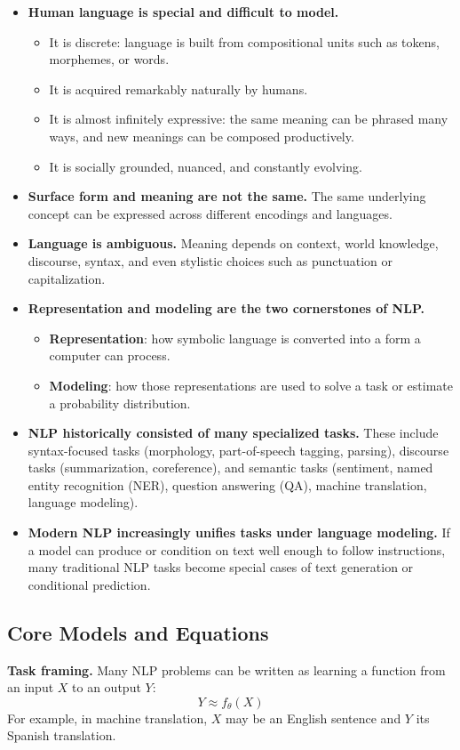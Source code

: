 \documentclass[11pt]{article}
\begin{document}
\begin{itemize}
    \item \textbf{Human language is special and difficult to model.}
    \begin{itemize}
        \item It is discrete: language is built from compositional units such as tokens, morphemes, or words.
        \item It is acquired remarkably naturally by humans.
        \item It is almost infinitely expressive: the same meaning can be phrased many ways, and new meanings can be composed productively.
        \item It is socially grounded, nuanced, and constantly evolving.
    \end{itemize}
    \item \textbf{Surface form and meaning are not the same.} The same underlying concept can be expressed across different encodings and languages.
    \item \textbf{Language is ambiguous.} Meaning depends on context, world knowledge, discourse, syntax, and even stylistic choices such as punctuation or capitalization.
    \item \textbf{Representation and modeling are the two cornerstones of NLP.}
    \begin{itemize}
        \item \textbf{Representation}: how symbolic language is converted into a form a computer can process.
        \item \textbf{Modeling}: how those representations are used to solve a task or estimate a probability distribution.
    \end{itemize}
    \item \textbf{NLP historically consisted of many specialized tasks.} These include syntax-focused tasks (morphology, part-of-speech tagging, parsing), discourse tasks (summarization, coreference), and semantic tasks (sentiment, named entity recognition (NER), question answering (QA), machine translation, language modeling).
    \item \textbf{Modern NLP increasingly unifies tasks under language modeling.} If a model can produce or condition on text well enough to follow instructions, many traditional NLP tasks become special cases of text generation or conditional prediction.
\end{itemize}

\subsection{Core Models and Equations}
\textbf{Task framing.} Many NLP problems can be written as learning a function from an input \(X\) to an output \(Y\):
\[
Y \approx f_\theta(X)
\]
For example, in machine translation, \(X\) may be an English sentence and \(Y\) its Spanish translation.
\end{document}
